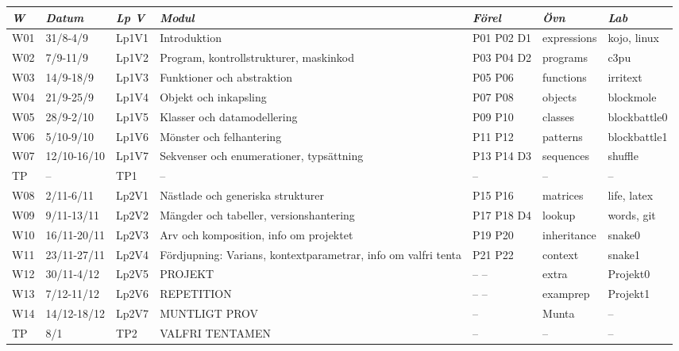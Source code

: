 \begin{tabular}{l|l|l|l|l|l|l}
\textit{W} & \textit{Datum} & \textit{Lp V} & \textit{Modul} & \textit{Förel} & \textit{Övn} & \textit{Lab} \\ \hline \hline
W01 & 31/8-4/9 & Lp1V1 & Introduktion & P01 P02 D1 & expressions & kojo, linux \\
W02 & 7/9-11/9 & Lp1V2 & Program, kontrollstrukturer, maskinkod & P03 P04 D2 & programs & c3pu \\
W03 & 14/9-18/9 & Lp1V3 & Funktioner och abstraktion & P05 P06 & functions & irritext \\
W04 & 21/9-25/9 & Lp1V4 & Objekt och inkapsling & P07 P08 & objects & blockmole \\
W05 & 28/9-2/10 & Lp1V5 & Klasser och datamodellering & P09 P10 & classes & blockbattle0 \\
W06 & 5/10-9/10 & Lp1V6 & Mönster och felhantering & P11 P12 & patterns & blockbattle1 \\
W07 & 12/10-16/10 & Lp1V7 & Sekvenser och enumerationer, typsättning & P13 P14 D3 & sequences & shuffle \\
TP & -- & TP1 & -- & -- & -- & -- \\
W08 & 2/11-6/11 & Lp2V1 & Nästlade och generiska strukturer & P15 P16 & matrices & life, latex \\
W09 & 9/11-13/11 & Lp2V2 & Mängder och tabeller, versionshantering & P17 P18 D4 & lookup & words, git \\
W10 & 16/11-20/11 & Lp2V3 & Arv och komposition, info om projektet & P19 P20 & inheritance & snake0 \\
W11 & 23/11-27/11 & Lp2V4 & Fördjupning: Varians, kontextparametrar, info om valfri tenta & P21 P22 & context & snake1 \\
W12 & 30/11-4/12 & Lp2V5 & PROJEKT & -- -- & extra & Projekt0 \\
W13 & 7/12-11/12 & Lp2V6 & REPETITION & -- -- & examprep & Projekt1 \\
W14 & 14/12-18/12 & Lp2V7 & MUNTLIGT PROV & -- & Munta & -- \\
TP & 8/1 & TP2 & VALFRI TENTAMEN & -- & -- & -- \\
\end{tabular}
